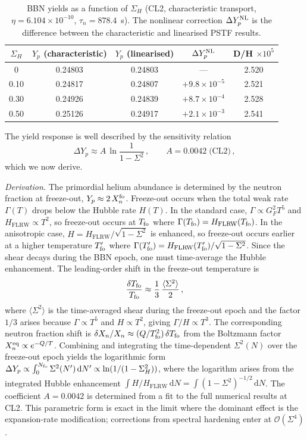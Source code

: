 \documentclass[a4paper,11pt]{article}
\newcommand{\Sig}{\Sigma}
\newcommand{\SigH}{\Sigma_H}
\newcommand{\Yp}{Y_p}
\newcommand{\FLRW}{\mathrm{FLRW}}
\newcommand{\dd}{\mathrm{d}}
\newcommand{\order}{\mathcal{O}}
\begin{document}
\begin{table}[t]
\centering
\caption{BBN yields as a function of $\SigH$ (CL2, characteristic transport, $\eta = 6.104\times 10^{-10}$, $\tau_n = 878.4$~s).  The nonlinear correction $\Delta\Yp^{\rm NL}$ is the difference between the characteristic and linearised PSTF results.}\label{tab:yields}
\begin{tabular}{ccccc}
\toprule
$\SigH$ & $\Yp$ (characteristic) & $\Yp$ (linearised) & $\Delta\Yp^{\rm NL}$ & D/H $\times 10^5$ \\
\midrule
0    & 0.24803 & 0.24803 & ---                   & 2.520 \\
0.10 & 0.24817 & 0.24807 & $+9.8\times 10^{-5}$  & 2.521 \\
0.30 & 0.24926 & 0.24839 & $+8.7\times 10^{-4}$  & 2.528 \\
0.50 & 0.25126 & 0.24917 & $+2.1\times 10^{-3}$  & 2.541 \\
\bottomrule
\end{tabular}
\end{table}

The yield response is well described by the sensitivity relation
\begin{equation}
\Delta\Yp \approx A\,\ln\!\frac{1}{1 - \Sig^2}\,,\qquad A = 0.0042\;\text{(CL2)}\,,\label{eq:sensitivity}
\end{equation}
which we now derive.

\textit{Derivation.}  The primordial helium abundance is determined by the neutron fraction at freeze-out, $\Yp \approx 2\,X_n^{\rm fo}$.  Freeze-out occurs when the total weak rate $\Gamma(T)$ drops below the Hubble rate $H(T)$.  In the standard case, $\Gamma \propto G_F^2 T^5$ and $H_\FLRW \propto T^2$, so freeze-out occurs at $T_{\rm fo}$ where $\Gamma(T_{\rm fo}) = H_\FLRW(T_{\rm fo})$.  In the anisotropic case, $H = H_\FLRW/\sqrt{1-\Sig^2}$ is enhanced, so freeze-out occurs earlier at a higher temperature $T_{\rm fo}'$ where $\Gamma(T_{\rm fo}') = H_\FLRW(T_{\rm fo}')/\sqrt{1-\Sig^2}$.  Since the shear decays during the BBN epoch, one must time-average the Hubble enhancement.  The leading-order shift in the freeze-out temperature is
\begin{equation}
\frac{\delta T_{\rm fo}}{T_{\rm fo}} \approx \frac{1}{3}\,\frac{\langle\Sig^2\rangle}{2}\,,
\end{equation}
where $\langle\Sig^2\rangle$ is the time-averaged shear during the freeze-out epoch and the factor $1/3$ arises because $\Gamma \propto T^5$ and $H \propto T^2$, giving $\Gamma/H \propto T^3$.  The corresponding neutron fraction shift is $\delta X_n / X_n \approx (Q/T_{\rm fo}^2)\,\delta T_{\rm fo}$ from the Boltzmann factor $X_n^{\rm eq} \propto e^{-Q/T}$.  Combining and integrating the time-dependent $\Sig^2(N)$ over the freeze-out epoch yields the logarithmic form $\Delta\Yp \propto \int_0^{N_{\rm fo}} \Sig^2(N')\,\dd N' \propto \ln(1/(1-\Sig_H^2))$, where the logarithm arises from the integrated Hubble enhancement $\int H/H_\FLRW\,\dd N = \int(1-\Sig^2)^{-1/2}\,\dd N$.  The coefficient $A = 0.0042$ is determined from a fit to the full numerical results at CL2.  This parametric form is exact in the limit where the dominant effect is the expansion-rate modification; corrections from spectral hardening enter at $\order(\Sig^4)$.
\end{document}
